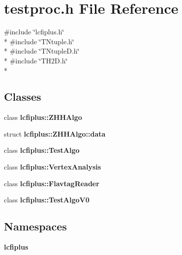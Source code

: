 \section{testproc.\-h File Reference}
\label{testproc_8h}
{\ttfamily \#include \char`\"{}lcfiplus.\-h\char`\"{}}\\*
{\ttfamily \#include \char`\"{}T\-Ntuple.\-h\char`\"{}}\\*
{\ttfamily \#include \char`\"{}T\-Ntuple\-D.\-h\char`\"{}}\\*
{\ttfamily \#include \char`\"{}T\-H2\-D.\-h\char`\"{}}\\*
\subsection*{Classes}
\begin{DoxyCompactItemize}
\item 
class {\bf lcfiplus\-::\-Z\-H\-H\-Algo}
\item 
struct {\bf lcfiplus\-::\-Z\-H\-H\-Algo\-::data}
\item 
class {\bf lcfiplus\-::\-Test\-Algo}
\item 
class {\bf lcfiplus\-::\-Vertex\-Analysis}
\item 
class {\bf lcfiplus\-::\-Flavtag\-Reader}
\item 
class {\bf lcfiplus\-::\-Test\-Algo\-V0}
\end{DoxyCompactItemize}
\subsection*{Namespaces}
\begin{DoxyCompactItemize}
\item 
{\bf lcfiplus}
\end{DoxyCompactItemize}
